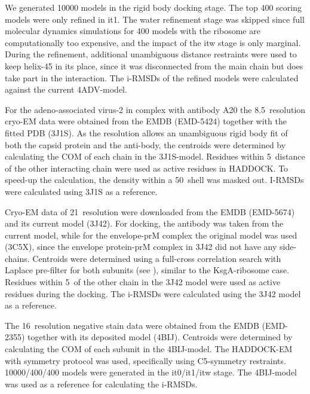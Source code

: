 We generated 10000 models in the rigid body docking stage.  The top 400 scoring
models were only refined in it1.  The water refinement stage was skipped since
full molecular dynamics simulations for 400 models with the ribosome are
computationally too expensive, and the impact of the itw stage is only
marginal.  During the refinement, additional unambiguous distance restraints
were used to keep helix-45 in its place, since it was disconnected from the
main chain but does take part in the interaction.  The i-RMSDs of the refined
models were calculated against the current 4ADV-model.


For the adeno-associated virus-2 in complex with antibody A20 the 8.5\Angstrom\
resolution cryo-EM data were obtained from the EMDB (EMD-5424) together with
the fitted PDB (3J1S).  As the resolution allows an unambiguous rigid body fit
of both the capsid protein and the anti-body, the centroids were determined by
calculating the COM of each chain in the 3J1S-model.  Residues within
5\Angstrom\ distance of the other interacting chain were used as active
residues in HADDOCK.  To speed-up the calculation, the density within a
50\Angstrom\ shell was masked out.  I-RMSDs were calculated using 3J1S as a
reference. 


Cryo-EM data of 21\Angstrom\ resolution were downloaded from the EMDB
(EMD-5674) and its current model (3J42).  For docking, the antibody was taken
from the current model, while for the envelope-prM complex the original model
was used (3C5X), since the envelope protein-prM complex in 3J42 did not have
any side-chains.  Centroids were determined using a full-cross correlation
search with Laplace pre-filter for both subunits (see
), similar to the KsgA-ribosome case.  Residues
within 5\Angstrom\ of the other chain in the 3J42 model were used as active
residues during the docking.  The i-RMSDs were calculated using the 3J42 model
as a reference.  


The 16\Angstrom\ resolution negative stain data were obtained from the EMDB
(EMD-2355) together with its deposited model (4BIJ).  Centroids were determined
by calculating the COM of each subunit in the 4BIJ-model.  The HADDOCK-EM with
symmetry protocol was used, specifically using C5-symmetry restraints.
10000/400/400 models were generated in the it0/it1/itw stage.  The 4BIJ-model
was used as a reference for calculating the i-RMSDs. 

